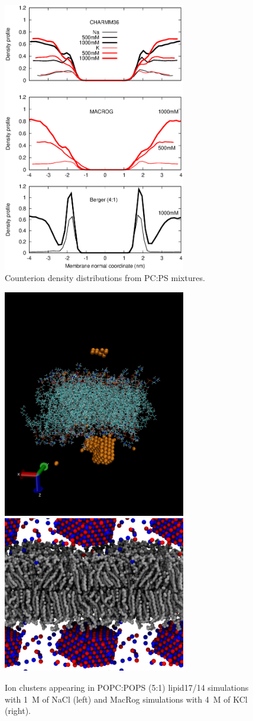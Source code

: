 \documentclass[journal=jpcbfk,manuscript=article]{achemso}
\begin{document}
\begin{figure}[]
  \centering
  \includegraphics[width=8.0cm]{../Figs/CIdensPSOCmixt.eps}
  \caption{  Counterion density distributions from PC:PS mixtures.
\label{CIdensPSOCmixt}
  }
\end{figure}
\begin{figure}[]
  \centering
  \includegraphics[width=8.0cm]{../Figs/lipid17cluster.png}
  \includegraphics[width=8.0cm]{../Figs/MacRogIONcluster.png}
  \caption{Ion clusters appearing in POPC:POPS (5:1) lipid17/14 simulations with 1~M of NaCl (left)
    and MacRog simulations with 4~M of KCl (right).
\label{ionCLUSTERS}
  }
\end{figure}
\end{document}
